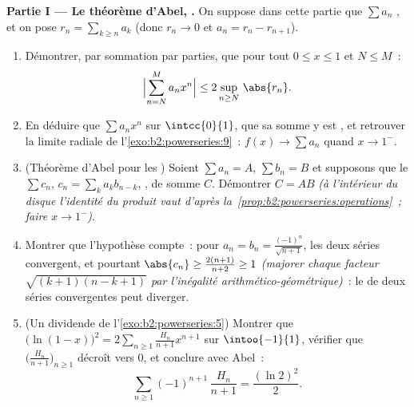 \begin{problem}
\medskip
\noindent\textbf{Partie I --- Le théorème d'Abel, .} On
suppose dans cette partie que $\sum a_n$ , et on pose $r_n =
\sum_{k\geq n} a_k$ (donc $r_n \to 0$ et $a_n = r_n -
r_{n+1}$).
\begin{enumerate}
  \item Démontrer, par sommation par parties, que pour tout $0 \leq x
        \leq 1$ et $N \leq M$~:
        \[
        \Bigl|\sum_{n=N}^{M} a_n x^n\Bigr|
        \leq 2\sup_{n \geq N}\,\abs{r_n} .
        \]
  \item En déduire que $\sum a_nx^n$  \emph{} sur
        $\intcc{0}{1}$, que sa somme y est , et
        retrouver la limite radiale de
        l'\cref{exo:b2:powerseries:9}~: $f(x) \to \sum a_n$ quand $x
        \to 1^-$.
  \item (Théorème d'Abel pour les ) Soient $\sum a_n = A$,
        $\sum b_n = B$ et supposons que le  $\sum
        c_n$, $c_n = \sum_{k} a_kb_{n-k}$, \emph{},
        de somme $C$. Démontrer $C = AB$ \emph{(à l'intérieur du disque
        l'identité du produit vaut d'après
        la~\cref{prop:b2:powerseries:operations}~; faire $x \to
        1^-$)}.
  \item Montrer que l'hypothèse compte~: pour $a_n = b_n =
        \frac{(-1)^n}{\sqrt{n+1}}$, les deux séries convergent, et pourtant
        $\abs{c_n} \geq \frac{2(n+1)}{n+2} \geq 1$ \emph{(majorer
        chaque facteur $\sqrt{(k+1)(n-k+1)}$ par l'inégalité arithmético-géométrique)}~: le
         de deux séries convergentes peut diverger.
  \item (Un dividende de l'\cref{exo:b2:powerseries:5}) Montrer que
        $\bigl(\ln(1-x)\bigr)^2 = 2\sum_{n\geq1}
        \frac{H_n}{n+1}x^{n+1}$ sur $\intoo{-1}{1}$, vérifier que
        $\bigl(\frac{H_n}{n+1}\bigr)_{n\geq1}$ décroît vers
        $0$, et conclure avec Abel~:
        \[
        \sum_{n\geq1} (-1)^{n+1}\,\frac{H_n}{n+1}
        = \frac{(\ln 2)^2}{2} .
        \]
\end{enumerate}


\end{problem}
